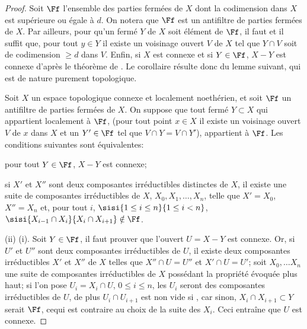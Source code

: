 \begin{proof}
Soit $\Ff$ l'ensemble des parties ferm\'ees de $X$ dont la codimension dans $X$ est sup\'erieure ou \'egale \`a $d$. On notera que $\Ff$ est un antifiltre de parties ferm\'ees de $X$. Par ailleurs, pour qu'un ferm\'e $Y$ de $X$ soit \'el\'ement de $\Ff$, il faut et il suffit que, pour tout $y\in Y$ il existe un voisinage ouvert $V$ de $X$ tel que $Y\cap V$ soit de codimension $\geq d$ dans $V$. Enfin, si $X$ est connexe et si $Y\in \Ff$, $X-Y$ est connexe d'apr\`es le th\'eor\`eme de . Le corollaire r\'esulte donc du lemme suivant, qui est de nature purement topologique.

\begin{lemme} \label{III.3.8}
Soit $X$ un espace topologique connexe et localement noeth\'erien, et soit $\Ff$ un antifiltre de parties ferm\'ees de $X$. On suppose que tout ferm\'e $Y\subset X$ qui appartient localement \`a $\Ff$, (\ie pour tout point $x\in X$ il existe un voisinage ouvert $V$ de $x$ dans $X$ et un $Y'\in \Ff$ tel que $V\cap Y=V\cap Y'$), appartient \`a $\Ff$. Les conditions suivantes sont \'equivalentes:
\begin{enumeratei}

\item
pour tout $Y\in \Ff$, $X-Y$ est connexe;

\item
si $X'$ et $X''$ sont deux composantes irr\'eductibles distinctes de $X$, il existe une suite de composantes irr\'eductibles de $X$, $X_0, X_1, \ldots, X_n$, telle que $X'=X_0$, $X''=X_n$ et, pour tout $i$, $\sisi{1\leq i\leq n}{1\leq i< n}$, $\sisi{X_{i-1} \cap X_i}{X_i \cap X_{i+1}} \notin \Ff$.
\end{enumeratei}
\end{lemme}

(ii) \ALORS (i). Soit $Y\in \Ff$, il faut prouver que l'ouvert $U=X-Y$ est connexe. Or, si $U'$ et $U''$ sont deux composantes irr\'eductibles de $U$, il existe deux composantes irr\'eductibles $X'$ et $X''$ de $X$ telles que $X''\cap U=U''$ et $X'\cap U=U'$; soit $X_0, \ldots X_n$ une suite de composantes irr\'eductibles de $X$ poss\'edant la propri\'et\'e \'evoqu\'ee plus haut; si l'on pose $U_i=X_i\cap U$, $0\leq i\leq n$, les $U_i$ seront des composantes irr\'eductibles de $U$, de plus $U_{i}\cap U_{i+1}$ est non vide si , car sinon, {$X_{i}\cap X_{i+1} \subset Y$} serait  $\Ff$, ce\pageoriginaled qui est contraire au choix de la suite des $X_i$. Ceci entra\^ine que $U$ est connexe.


\end{proof}
